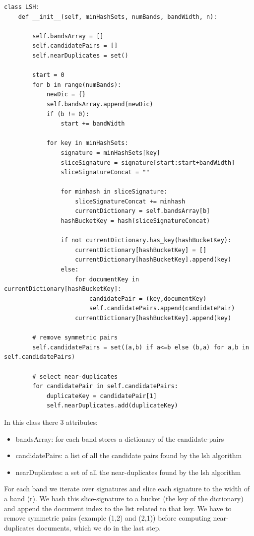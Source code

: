\documentclass{article}
\begin{document}
\begin{lstlisting} 
class LSH:
    def __init__(self, minHashSets, numBands, bandWidth, n):

        self.bandsArray = []
        self.candidatePairs = []
        self.nearDuplicates = set()

        start = 0
        for b in range(numBands):
            newDic = {}
            self.bandsArray.append(newDic)
            if (b != 0):
                start += bandWidth

            for key in minHashSets:
                signature = minHashSets[key]
                sliceSignature = signature[start:start+bandWidth]
                sliceSignatureConcat = ""

                for minhash in sliceSignature:
                    sliceSignatureConcat += minhash
                    currentDictionary = self.bandsArray[b]
                hashBucketKey = hash(sliceSignatureConcat)

                if not currentDictionary.has_key(hashBucketKey):
                    currentDictionary[hashBucketKey] = []
                    currentDictionary[hashBucketKey].append(key)
                else:
                    for documentKey in currentDictionary[hashBucketKey]:
                        candidatePair = (key,documentKey)
                        self.candidatePairs.append(candidatePair)
                    currentDictionary[hashBucketKey].append(key)

        # remove symmetric pairs
        self.candidatePairs = set((a,b) if a<=b else (b,a) for a,b in self.candidatePairs)

        # select near-duplicates
        for candidatePair in self.candidatePairs:
            duplicateKey = candidatePair[1]
            self.nearDuplicates.add(duplicateKey)
\end{lstlisting}

In this class there 3 attributes: 
\begin{itemize}
	\item bandsArray: for each band stores a dictionary of the candidate-pairs
	\item candidatePairs: a list of all the candidate pairs found by the lsh algorithm
	\item nearDuplicates: a set of all the near-duplicates found by the lsh algorithm
\end{itemize}

For each band we iterate over signatures and slice each signature to the width of a band (r). We hash this slice-signature to a bucket (the key of the dictionary) and append the document index to the list related to that key. We have to remove symmetric pairs (example (1,2) and (2,1)) before computing near-duplicates documents, which we do in the last step.
\end{document}
